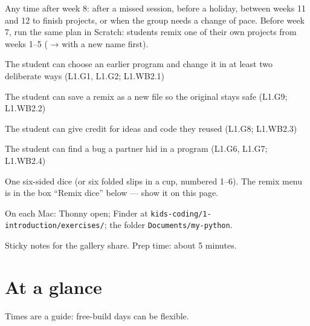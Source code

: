 
\begin{teachernote}
Any time after week 8: after a missed session, before a holiday, between weeks 11 and 12 to finish projects, or when the group needs a change of pace. Before week 7, run the same plan in Scratch: students remix one of their own projects from weeks 1--5 ( →  with a new name first).
\end{teachernote}

\begin{objectives}
  \item The student can choose an earlier program and change it in at least two deliberate ways (L1.G1, L1.G2; L1.WB2.1)
  \item The student can save a remix as a new file so the original stays safe (L1.G9; L1.WB2.2)
  \item The student can give credit for ideas and code they reused (L1.G8; L1.WB2.3)
  \item The student can find a bug a partner hid in a program (L1.G6, L1.G7; L1.WB2.4)
\end{objectives}

\begin{materials}
  \item One six-sided dice (or six folded slips in a cup, numbered 1--6). The remix menu is in the box \enquote{Remix dice} below --- show it on this page.
  \item On each Mac: Thonny open; Finder at \texttt{kids-coding/1-introduction/exercises/}; the folder \texttt{Documents/my-python}.
  \item Sticky notes for the gallery share. Prep time: about 5 minutes.
\end{materials}

\section{At a glance}
Times are a guide: free-build days can be flexible.
\begin{timeplan}
\end{timeplan}


